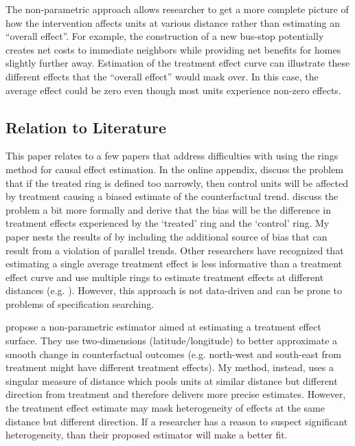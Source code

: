 \documentclass[10pt]{article}
\begin{document}
The non-parametric approach allows researcher to get a more complete picture of how the intervention affects units at various distance rather than estimating an ``overall effect''. For example, the construction of a new bus-stop potentially creates net costs to immediate neighbors while providing net benefits for homes slightly further away. Estimation of the treatment effect curve can illustrate these different effects that the ``overall effect'' would mask over. In this case, the average effect could be zero even though most units experience non-zero effects.

\subsection{Relation to Literature}

This paper relates to a few papers that address difficulties with using the rings method for causal effect estimation. In the online appendix, \citet{Gerardi_Rosenblatt_Willen_Yao_2015} discuss the problem that if the treated ring is defined too narrowly, then control units will be affected by treatment causing a biased estimate of the counterfactual trend. \citet{Sullivan_2017} discuss the problem a bit more formally and derive that the bias will be the difference in treatment effects experienced by the `treated' ring and the `control' ring. My paper nests the results of \citet{Sullivan_2017} by including the additional source of bias that can result from a violation of parallel trends. Other researchers have recognized that estimating a single average treatment effect is less informative than a treatment effect curve and use multiple rings to estimate treatment effects at different distances (e.g. \citet{Alexander_Currie_Schnell_2019}). However, this approach is not data-driven and can be prone to problems of specification searching.

\citet{Diamond_McQuade_2019} propose a non-parametric estimator aimed at estimating a treatment effect surface. They use two-dimensions (latitude/longitude) to better approximate a smooth change in counterfactual outcomes (e.g. north-west and south-east from treatment might have different treatment effects). My method, instead, uses a singular measure of distance which pools units at similar distance but different direction from treatment and therefore delivers more precise estimates. However, the treatment effect estimate may mask heterogeneity of effects at the same distance but different direction. If a researcher has a reason to suspect significant heterogeneity, than their proposed estimator will make a better fit.
\end{document}
